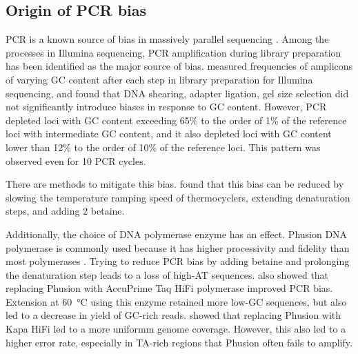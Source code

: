 \documentclass[parskip=full, numbers=noenddot]{scrreprt}
\begin{document}
\subsection{Origin of PCR bias}
\label{ssec:pcrbias_intro_origin}

PCR is a known source of bias in massively parallel sequencing \citep{olova_comparison_2018}.  Among the processes in Illumina sequencing, PCR amplification during library preparation has been identified as the major source of bias.
\citet{aird_analyzing_2011} measured frequencies of amplicons of varying GC content after each step in library preparation for Illumina sequencing, and found that DNA shearing, adapter ligation, gel size selection did not significantly introduce biases in response to GC content.  However, PCR depleted loci with GC content exceeding 65\% to the order of 1\% of the reference loci with intermediate GC content, and it also depleted loci with GC content lower than 12\% to the order of 10\% of the reference loci.  This pattern was observed even for 10 PCR cycles.


There are methods to mitigate this bias.  \citet{aird_analyzing_2011} found that this bias can be reduced by slowing the temperature ramping speed of thermocyclers, extending denaturation steps, and adding \SI{2}{\Molar} betaine.

Additionally, the choice of DNA polymerase enzyme has an effect.  Phusion DNA polymerase is commonly used because it has higher processivity and fidelity than most polymerases \citep{quail_optimal_2012}. Trying to reduce PCR bias by adding betaine and prolonging the denaturation step leads to a loss of high-AT sequences.  \citet{aird_analyzing_2011} also showed that replacing Phusion with AccuPrime Taq HiFi polymerase improved PCR bias.  Extension at \SI{60}{\celsius} using this enzyme retained more low-GC sequences, but also led to a decrease in yield of GC-rich reads.  \citet{quail_optimal_2012} showed that replacing Phusion with Kapa HiFi led to a more uniformm genome coverage.  However, this also led to a higher error rate, especially in TA-rich regions that Phusion often fails to amplify.
\end{document}
